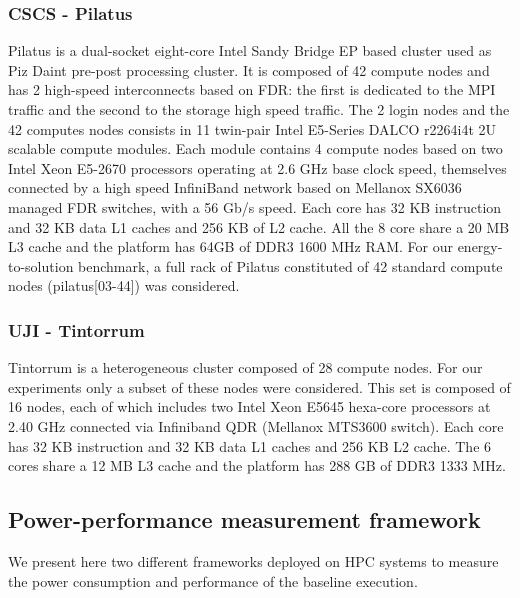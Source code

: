 \subsubsection{CSCS - Pilatus} 
Pilatus  is  a dual-socket  eight-core  Intel  Sandy  Bridge EP  based
cluster used as Piz Daint pre-post processing cluster.  It is composed
of 42 compute  nodes and has 2 high-speed  interconnects based on FDR:
the  first is  dedicated to  the  MPI traffic  and the  second to  the
storage high  speed traffic.   The 2 login  nodes and the  42 computes
nodes  consists in  11  twin-pair Intel  E5-Series  DALCO r2264i4t  2U
scalable compute modules.  Each  module contains 4 compute nodes based
on two Intel  Xeon E5-2670 processors operating at  2.6 GHz base clock
speed, themselves  connected by a high speed  InfiniBand network based
on Mellanox  SX6036 managed FDR switches,  with a 56  Gb/s speed. Each
core has 32 KB  instruction and 32 KB data L1 caches  and 256 KB of L2
cache.  All  the 8 core share  a 20 MB  L3 cache and the  platform has
64GB of  DDR3 1600 MHz  RAM.  For our energy-to-solution  benchmark, a
full  rack  of  Pilatus  constituted  of  42  standard  compute  nodes
(pilatus[03-44]) was considered.

\subsubsection{UJI - Tintorrum} 
Tintorrum  is a heterogeneous  cluster composed  of 28  compute nodes.
For our experiments only a subset of these nodes were considered. This
set is  composed of 16  nodes, each of  which includes two  Intel Xeon
E5645 hexa-core  processors at 2.40  GHz connected via  Infiniband QDR
(Mellanox MTS3600 switch).  Each core  has 32 KB instruction and 32 KB
data L1 caches and 256 KB L2 cache. The 6 cores share a 12 MB L3 cache
and the platform has 288 GB of DDR3 1333 MHz.

\subsection{Power-performance measurement framework}
\label{subsec:3.3}

We present  here two different  frameworks deployed on HPC  systems to
measure  the  power  consumption   and  performance  of  the  baseline
execution.

